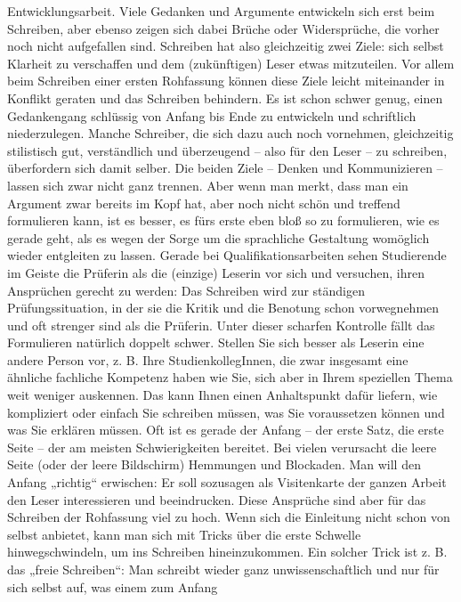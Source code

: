 \documentclass[]{book}
\theoremstyle{definition}
\theoremstyle{definition}
\theoremstyle{definition}
\theoremstyle{remark}
\begin{document}
Entwicklungsarbeit. Viele Gedanken und Argumente entwickeln sich erst
beim Schreiben, aber ebenso zeigen sich dabei Brüche oder Widersprüche,
die vorher noch nicht aufgefallen sind. Schreiben hat also gleichzeitig
zwei Ziele: sich selbst Klarheit zu verschaffen und dem (zukünftigen)
Leser etwas mitzuteilen. Vor allem beim Schreiben einer ersten
Rohfassung können diese Ziele leicht miteinander in Konflikt geraten und
das Schreiben behindern. Es ist schon schwer genug, einen Gedankengang
schlüssig von Anfang bis Ende zu entwickeln und schriftlich
niederzulegen. Manche Schreiber, die sich dazu auch noch vornehmen,
gleichzeitig stilistisch gut, verständlich und überzeugend -- also für
den Leser -- zu schreiben, überfordern sich damit selber. Die beiden
Ziele -- Denken und Kommunizieren -- lassen sich zwar nicht ganz
trennen. Aber wenn man merkt, dass man ein Argument zwar bereits im Kopf
hat, aber noch nicht schön und treffend formulieren kann, ist es besser,
es fürs erste eben bloß so zu formulieren, wie es gerade geht, als es
wegen der Sorge um die sprachliche Gestaltung womöglich wieder
entgleiten zu lassen. Gerade bei Qualifikationsarbeiten sehen
Studierende im Geiste die Prüferin als die (einzige) Leserin vor sich
und versuchen, ihren Ansprüchen gerecht zu werden: Das Schreiben wird
zur ständigen Prüfungssituation, in der sie die Kritik und die Benotung
schon vorwegnehmen und oft strenger sind als die Prüferin. Unter dieser
scharfen Kontrolle fällt das Formulieren natürlich doppelt schwer.
Stellen Sie sich besser als Leserin eine andere Person vor, z. B. Ihre
StudienkollegInnen, die zwar insgesamt eine ähnliche fachliche Kompetenz
haben wie Sie, sich aber in Ihrem speziellen Thema weit weniger
auskennen. Das kann Ihnen einen Anhaltspunkt dafür liefern, wie
kompliziert oder einfach Sie schreiben müssen, was Sie voraussetzen
können und was Sie erklären müssen. Oft ist es gerade der Anfang -- der
erste Satz, die erste Seite -- der am meisten Schwierigkeiten bereitet.
Bei vielen verursacht die leere Seite (oder der leere Bildschirm)
Hemmungen und Blockaden. Man will den Anfang „richtig`` erwischen: Er
soll sozusagen als Visitenkarte der ganzen Arbeit den Leser
interessieren und beeindrucken. Diese Ansprüche sind aber für das
Schreiben der Rohfassung viel zu hoch. Wenn sich die Einleitung nicht
schon von selbst anbietet, kann man sich mit Tricks über die erste
Schwelle hinwegschwindeln, um ins Schreiben hineinzukommen. Ein solcher
Trick ist z. B. das „freie Schreiben``: Man schreibt wieder ganz
unwissenschaftlich und nur für sich selbst auf, was einem zum Anfang
\end{document}
